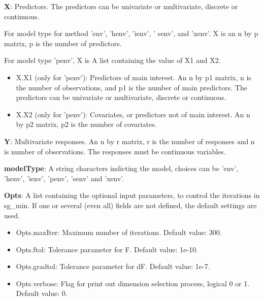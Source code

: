 \documentclass[a4paper,11pt,openany]{memoir}
\begin{document}
\begin{par}
\textbf{X}: Predictors.  The predictors can be univariate or multivariate, discrete or continuous.
\end{par} \vspace{1em}
\begin{par}
For model type for method 'env', 'henv', 'ienv', ' senv', and 'xenv'. X is an n by p matrix, p is the number of predictors.
\end{par} \vspace{1em}
\begin{par}
For model type 'penv', X is  A list containing the value of X1 and X2.
\end{par} \vspace{1em}
\begin{itemize}
\setlength{\itemsep}{-1ex}
   \item X.X1 (only for 'penv'): Predictors of main interest. An n by p1 matrix, n is the number of observations, and p1 is the number of main predictors. The predictors can be univariate or multivariate, discrete or continuous.
   \item X.X2 (only for 'penv'): Covariates, or predictors not of main interest.  An n by p2 matrix, p2 is the number of covariates.
\end{itemize}
\begin{par}
\textbf{Y}: Multivariate responses. An n by r matrix, r is the number of responses and n is number of observations. The responses must be continuous variables.
\end{par} \vspace{1em}
\begin{par}
\textbf{modelType}: A string characters indicting the model, choices can be 'env', 'henv', 'ienv', 'penv', 'senv' and 'xenv'.
\end{par} \vspace{1em}
\begin{par}
\textbf{Opts}: A list containing the optional input parameters, to control the iterations in sg\_min. If one or several (even all) fields are not defined, the default settings are used.
\end{par} \vspace{1em}
\begin{itemize}
\setlength{\itemsep}{-1ex}
   \item Opts.maxIter: Maximum number of iterations.  Default value: 300.
   \item Opts.ftol: Tolerance parameter for F.  Default value: 1e-10.
   \item Opts.gradtol: Tolerance parameter for dF.  Default value: 1e-7.
   \item Opts.verbose: Flag for print out dimension selection process, logical 0 or 1. Default value: 0.
\end{itemize}
\end{document}
